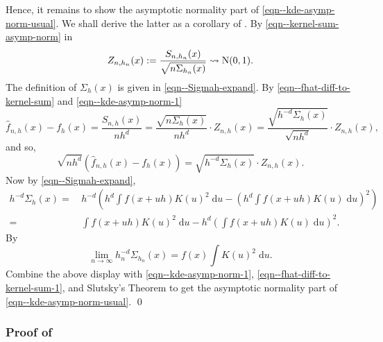 Hence, it remains to show the asymptotic normality part of
\eqref{eqn--kde-asymp-norm-usual}.
We shall derive the latter as a corollary of .
By \eqref{eqn--kernel-sum-asymp-norm} in 
\begin{equation}
  Z_{n, h_{n}} (x) := \frac{S_{n, h_{n}} (x)}{\sqrt{n \Sigma_{h_{n}} (x)}}
  \rightsquigarrow \mathrm{N} (0, 1).
  \label{eqn--kde-asymp-norm-1}
\end{equation}
The definition of \(\Sigma_{h} (x)\) is given in \eqref{eqn--Sigmah-expand}.
By \eqref{eqn--fhat-diff-to-kernel-sum} and \eqref{eqn--kde-asymp-norm-1}
\begin{equation*}
  \widehat{f}_{n, h} (x) - f_{h} (x) = \frac{S_{n, h} (x)}{n h^{d}} =
  \frac{\sqrt{n \Sigma_{h} (x)}}{n h^{d}} \cdot Z_{n, h} (x) = \frac{\sqrt{h^{-
  d} \Sigma_{h} (x)}}{\sqrt{n h^{d}}} \cdot Z_{n, h} (x),
\end{equation*}
and so,
\begin{equation}
  \sqrt{n h^{d}} \left( \widehat{f}_{n, h} (x) - f_{h} (x) \right) =
  \sqrt{h^{- d} \Sigma_{h} (x)} \cdot Z_{n, h} (x).
  \label{eqn--fhat-diff-to-kernel-sum-1}
\end{equation}
Now by \eqref{eqn--Sigmah-expand},
\begin{align*}
  h^{- d} \Sigma_{h} (x) =
  & \, h^{- d} \left( h^{d} \int f (x + u h) K (u)^{2} \; \mathrm{d} u - \left(
  h^{d} \int f (x + u h) K (u) \; \mathrm{d} u \right)^{2} \right) \\
  =
  & \, \int f (x + u h) K (u)^{2} \; \mathrm{d} u - h^{d} \left( \int f (x + u
  h) K (u) \; \mathrm{d} u \right)^{2}.
\end{align*}
By 
\begin{equation*}
  \lim_{n \to \infty} h_{n}^{- d} \Sigma_{h_{n}} (x) = f (x) \int K (u)^{2} \;
  \mathrm{d} u.
\end{equation*}
Combine the above display with \eqref{eqn--kde-asymp-norm-1},
\eqref{eqn--fhat-diff-to-kernel-sum-1}, and Slutsky's Theorem to get the
asymptotic normality part of \eqref{eqn--kde-asymp-norm-usual}.
\qed

\subsubsection{Proof of
\texorpdfstring{}{Theorem
\ref{thm--kernel-sum-asymp-norm}}}
\label{sec--prf--thm--kernel-sum-asymp-norm}

